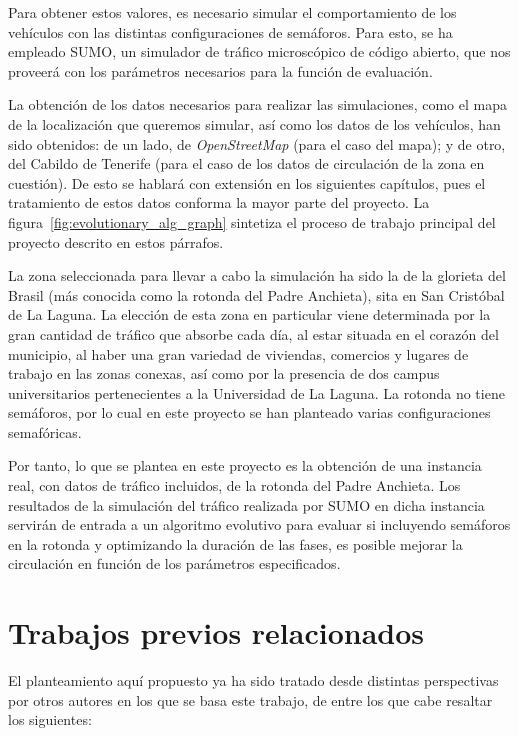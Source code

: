 Para obtener estos valores, es necesario simular el comportamiento de los vehículos con las distintas configuraciones de semáforos. Para esto, se ha empleado SUMO, un simulador de tráfico microscópico de código abierto, que nos proveerá con los parámetros necesarios para la función de evaluación.

La obtención de los datos necesarios para realizar las simulaciones, como el mapa de la localización que queremos simular, así como los datos de los vehículos, han sido obtenidos: de un lado, de \textit{OpenStreetMap} (para el caso del mapa); y de otro, del Cabildo de Tenerife (para el caso de los datos de circulación de la zona en cuestión). De esto se hablará con extensión en los siguientes capítulos, pues el tratamiento de estos datos conforma la mayor parte del proyecto. La figura~\ref{fig:evolutionary_alg_graph} sintetiza el proceso de trabajo principal del proyecto descrito en estos párrafos.

La zona seleccionada para llevar a cabo la simulación ha sido la de la glorieta del Brasil (más conocida como la rotonda del Padre Anchieta), sita en San Cristóbal de La Laguna. La elección de esta zona en particular viene determinada por la gran cantidad de tráfico que absorbe cada día, al estar situada en el corazón del municipio, al haber una gran variedad de viviendas, comercios y lugares de trabajo en las zonas conexas, así como por la presencia de dos campus universitarios pertenecientes a la Universidad de La Laguna. La rotonda no tiene semáforos, por lo cual en este proyecto se han planteado varias configuraciones semafóricas.

Por tanto, lo que se plantea en este proyecto es la obtención de una instancia real, con datos de tráfico incluidos, de la rotonda del Padre Anchieta. Los resultados de la simulación del tráfico realizada por SUMO en dicha instancia servirán de entrada a un algoritmo evolutivo para evaluar si incluyendo semáforos en la rotonda y optimizando la duración de las fases, es posible mejorar la circulación en función de los parámetros especificados.


\section{Trabajos previos relacionados}

El planteamiento aquí propuesto ya ha sido tratado desde distintas perspectivas por otros autores en los que se basa este trabajo, de entre los que cabe resaltar los siguientes:

